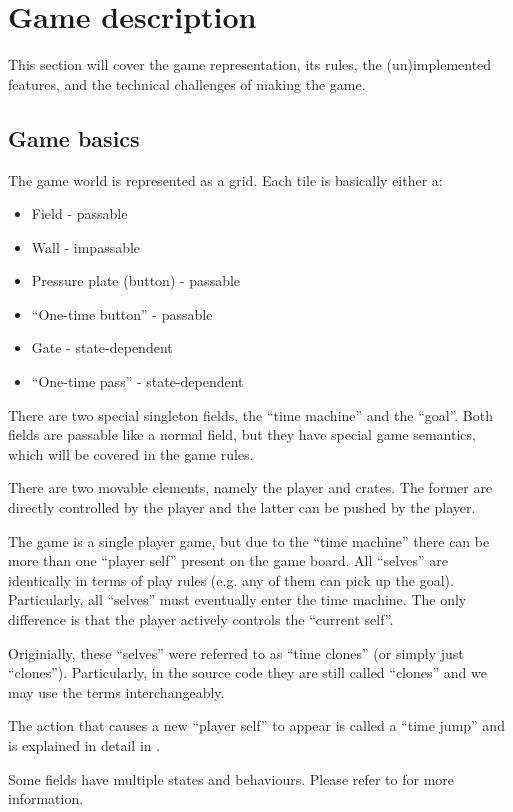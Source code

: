 \section{Game description}

This section will cover the game representation, its rules, the
(un)implemented features, and the technical challenges of making the
game.

\subsection{Game basics}
The game world is represented as a grid.  Each tile is basically
either a:

\begin{itemize}
\item Field - passable
\item Wall - impassable
\item Pressure plate (button) - passable
\item ``One-time button'' - passable
\item Gate - state-dependent
\item ``One-time pass'' - state-dependent
\end{itemize}

There are two special singleton fields, the ``time machine'' and
the ``goal''.  Both fields are passable like a normal field, but
they have special game semantics, which will be covered in the
game rules.

There are two movable elements, namely the player and crates.  The
former are directly controlled by the player and the latter can be
pushed by the player.

The game is a single player game, but due to the ``time machine''
there can be more than one ``player self'' present on the game board.
All ``selves'' are identically in terms of play rules (e.g. any of
them can pick up the goal).  Particularly, all ``selves'' must
eventually enter the time machine.  The only difference is that the
player actively controls the ``current self''.

Originially, these ``selves'' were referred to as ``time clones'' (or
simply just ``clones'').  Particularly, in the source code they are
still called ``clones'' and we may use the terms interchangeably.

The action that causes a new ``player self'' to appear is called a
``time jump'' and is explained in detail in .

Some fields have multiple states and behaviours.  Please refer to
 for more information.

